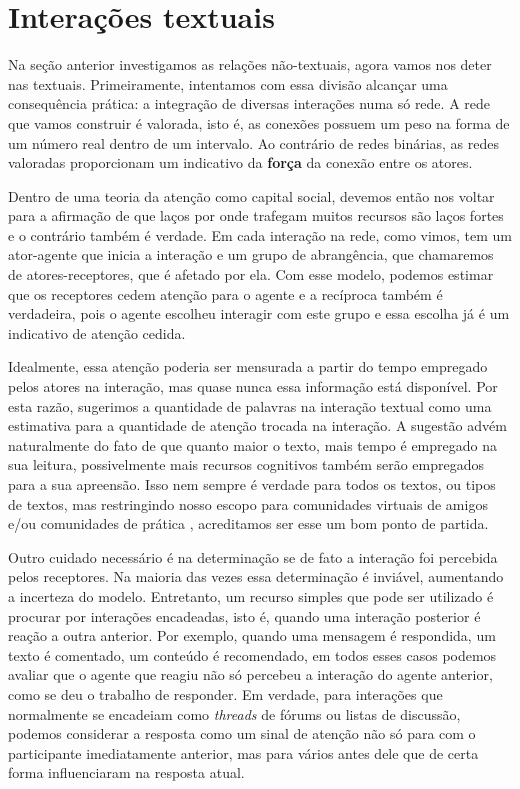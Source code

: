 \section{Interações textuais}

Na seção anterior investigamos as relações não-textuais, agora vamos nos deter
nas textuais. Primeiramente, intentamos com essa divisão alcançar uma
consequência prática: a integração de diversas interações numa só rede. A rede
que vamos construir é valorada, isto é, as conexões possuem um peso na forma de
um número real dentro de um intervalo. Ao contrário de redes binárias, as redes
valoradas proporcionam um indicativo da \textbf{força} da conexão entre os
atores.

Dentro de uma teoria da atenção como capital social, devemos então nos voltar
para a afirmação de que laços por onde trafegam muitos recursos são laços fortes
e o contrário também é verdade. Em cada interação na rede, como vimos, tem um
ator-agente que inicia a interação e um grupo de abrangência, que chamaremos de
atores-receptores, que é afetado por ela. Com esse modelo, podemos estimar que
os receptores cedem atenção para o agente e a recíproca também é verdadeira,
pois o agente escolheu interagir com este grupo e essa escolha já é um
indicativo de atenção cedida.

Idealmente, essa atenção poderia ser mensurada a partir do tempo empregado pelos
atores na interação, mas quase nunca essa informação está disponível. Por esta
razão, sugerimos a quantidade de palavras na interação textual como uma
estimativa para a quantidade de atenção trocada na interação. A sugestão advém
naturalmente do fato de que quanto maior o texto, mais tempo é empregado na sua
leitura, possivelmente mais recursos cognitivos também serão empregados para a
sua apreensão. Isso nem sempre é verdade para todos os textos, ou tipos de
textos, mas restringindo nosso escopo para comunidades virtuais de amigos e/ou
comunidades de prática \citep{Lave1991, Lave1991a}, acreditamos ser esse
um bom ponto de partida.

Outro cuidado necessário é na determinação se de fato a interação foi percebida
pelos receptores. Na maioria das vezes essa determinação é inviável, aumentando
a incerteza do modelo. Entretanto, um recurso simples que pode ser utilizado é
procurar por interações encadeadas, isto é, quando uma interação posterior é 
reação a outra anterior. Por exemplo, quando uma mensagem é respondida, um texto
é comentado, um conteúdo é recomendado, em todos esses casos podemos avaliar que
o agente que reagiu não só percebeu a interação do agente anterior, como se deu
o trabalho de responder. Em verdade, para interações que normalmente se
encadeiam como \emph{threads} de fórums ou listas de discussão, podemos
considerar a resposta como um sinal de atenção não só para com o participante
imediatamente anterior, mas para vários antes dele que de certa forma
influenciaram na resposta atual.

